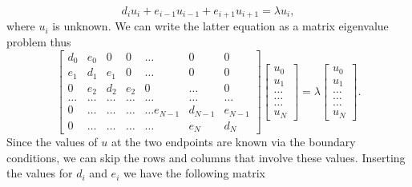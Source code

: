 \documentclass[10pt,showpacs,preprintnumbers,footinbib,amsmath,amssymb,aps,prl,twocolumn,groupedaddress,superscriptaddress,showkeys]{revtex4-1}
\begin{document}
\begin{equation*}
d_iu_i+e_{i-1}u_{i-1}+e_{i+1}u_{i+1}  = \lambda u_i,
\end{equation*}
where $u_i$ is unknown. We can write the 
latter equation as a matrix eigenvalue problem thus
\begin{equation}
    \begin{bmatrix}d_0 & e_0 & 0   & 0    & \dots  &0     & 0 \\
                                e_1 & d_1 & e_1 & 0    & \dots  &0     &0 \\
                                0   & e_2 & d_2 & e_2  &0       &\dots & 0\\
                                \dots  & \dots & \dots & \dots  &\dots      &\dots & \dots\\
                                0   & \dots & \dots & \dots  &\dots  e_{N-1}     &d_{N-1} & e_{N-1}\\
                                0   & \dots & \dots & \dots  &\dots       &e_{N} & d_{N}
             \end{bmatrix}  \begin{bmatrix} u_{0} \\
                                                              u_{1} \\
                                                              \dots\\ \dots\\ \dots\\
                                                              u_{N}
             \end{bmatrix}=\lambda \begin{bmatrix} u_{0} \\
                                                              u_{1} \\
                                                              \dots\\ \dots\\ \dots\\
                                                              u_{N}
             \end{bmatrix}.  
      \label{eq:sematrix}
\end{equation}
Since the values of $u$ at the two endpoints are known via the boundary conditions, we can skip the rows and columns that involve these values. Inserting the values for $d_i$ and $e_i$ we have the following matrix
\end{document}
